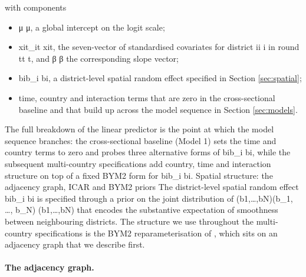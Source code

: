\documentclass{article}
\begin{document}
with components

\begin{itemize}

\item μ\mu
μ, a global intercept on the logit scale;

\item xit_{it}
xit​, the seven-vector of standardised covariates for district ii
i in round tt
t, and β\bm{\beta}
β the corresponding slope vector;

\item bib_i
bi​, a district-level spatial random effect specified in Section \ref{sec:spatial};

\item time, country and interaction terms that are zero in the cross-sectional baseline and that build up across the model sequence in Section \ref{sec:models}.

\end{itemize}

The full breakdown of the linear predictor is the point at which the
model sequence branches: the cross-sectional baseline (Model 1) sets the
time and country terms to zero and probes three alternative forms of
bib\_i bi\hspace{0pt}, while the subsequent multi-country specifications
add country, time and interaction structure on top of a fixed BYM2 form
for bib\_i bi\hspace{0pt}. Spatial structure: the adjacency graph, ICAR
and BYM2 priors \label{sec:spatial} The district-level spatial random
effect bib\_i bi\hspace{0pt} is specified through a prior on the joint
distribution of (b1,\ldots,bN)(b\_1, \ldots, b\_N)
(b1\hspace{0pt},\ldots,bN\hspace{0pt}) that encodes the substantive
expectation of smoothness between neighbouring districts. The structure
we use throughout the multi-country specifications is the BYM2
reparameterisation of \citep{riebler2016}, which sits on an adjacency
graph that we describe first.

\paragraph{The adjacency graph.}
\end{document}

